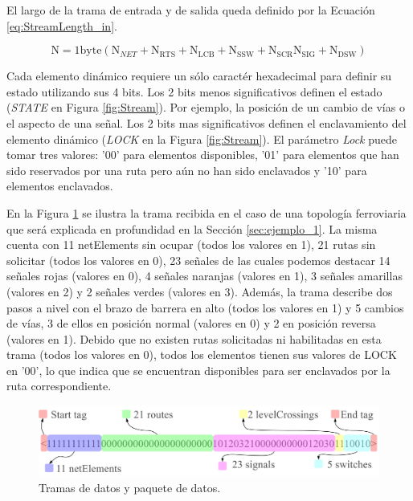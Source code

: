 	El largo de la trama de entrada y de salida queda definido por la Ecuación \ref{eq:StreamLength_in}. 
	
	\begin{equation} 
		\label{eq:StreamLength_in}
		\text{N} = 1\text{byte} (\text{N}_{NET}+\text{N}_{\text{RTS}}+\text{N}_{\text{LCB}}+\text{N}_{\text{SSW}}+\text{N}_{\text{SCR}}\text{N}_{\text{SIG}}+\text{N}_{\text{DSW}})
	\end{equation}
	
	Cada elemento dinámico requiere un sólo caractér hexadecimal para definir su estado utilizando sus 4 bits. Los 2 bits menos significativos definen el estado (\textit{STATE} en Figura \ref{fig:Stream}). Por ejemplo, la posición de un cambio de vías o el aspecto de una señal. Los 2 bits mas significativos definen el enclavamiento del elemento dinámico (\textit{LOCK} en la Figura \ref{fig:Stream}). El parámetro \textit{Lock} puede tomar tres valores: '00' para elementos disponibles, '01' para elementos que han sido reservados por una ruta pero aún no han sido enclavados y '10' para elementos enclavados.
	
	En la Figura \ref{fig:Stream_ejemplo1} se ilustra la trama recibida en el caso de una topología ferroviaria que será explicada en profundidad en la Sección \ref{sec:ejemplo_1}. La misma cuenta con 11 netElements sin ocupar (todos los valores en 1), 21 rutas sin solicitar (todos los valores en 0), 23 señales de las cuales podemos destacar 14 señales rojas (valores en 0), 4 señales naranjas (valores en 1), 3 señales amarillas (valores en 2) y 2 señales verdes (valores en 3). Además, la trama describe dos pasos a nivel con el brazo de barrera en alto (todos los valores en 1) y 5 cambios de vías, 3 de ellos en posición normal (valores en 0) y 2 en posición reversa (valores en 1). Debido que no existen rutas solicitadas ni habilitadas en esta trama (todos los valores en 0), todos los elementos tienen sus valores de LOCK en '00', lo que indica que se encuentran disponibles para ser enclavados por la ruta correspondiente.
	
	\begin{figure}[H]
		\centering
		\includegraphics[width=1\textwidth]{Figuras/Trama_ejemplo.jpg}
		\centering\caption{Tramas de datos y paquete de datos.}
		\label{fig:Stream_ejemplo1}
	\end{figure}

